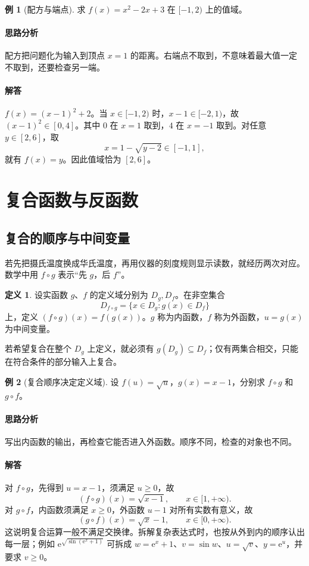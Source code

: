 \documentclass[UTF8,fontset=fandol,12pt,oneside,openany]{ctexrep}
\newcommand{\ee}{\mathrm e}
\theoremstyle{definition}
\newtheorem{definition}[theorem]{定义}
\newtheorem{example}{例}[chapter]
\begin{document}
\begin{example}[配方与端点]
求 $f(x)=x^2-2x+3$ 在 $[-1,2)$ 上的值域。
\end{example}
\paragraph{思路分析} 配方把问题化为输入到顶点 $x=1$ 的距离。右端点不取到，不意味着最大值一定不取到，还要检查另一端。
\paragraph{解答} $f(x)=(x-1)^2+2$。当 $x\in[-1,2)$ 时，$x-1\in[-2,1)$，故 $(x-1)^2\in[0,4]$。其中 $0$ 在 $x=1$ 取到，$4$ 在 $x=-1$ 取到。对任意 $y\in[2,6]$，取
\[
 x=1-\sqrt{y-2}\in[-1,1],
\]
就有 $f(x)=y$。因此值域恰为 $[2,6]$。

\section{复合函数与反函数}
\label{lec:01:composition}
\subsection{复合的顺序与中间变量}
若先把摄氏温度换成华氏温度，再用仪器的刻度规则显示读数，就经历两次对应。数学中用 $f\circ g$ 表示“先 $g$，后 $f$”。

\begin{definition}
设实函数 $g$、$f$ 的定义域分别为 $D_g,D_f$。在非空集合
\[
 D_{f\circ g}=\{x\in D_g:g(x)\in D_f\}
\]
上，定义 $(f\circ g)(x)=f(g(x))$。$g$ 称为内函数，$f$ 称为外函数，$u=g(x)$ 为中间变量。
\end{definition}
若希望复合在整个 $D_g$ 上定义，就必须有 $g(D_g)\subseteq D_f$；仅有两集合相交，只能在符合条件的部分输入上复合。

\begin{example}[复合顺序决定定义域]
设 $f(u)=\sqrt{u}$，$g(x)=x-1$，分别求 $f\circ g$ 和 $g\circ f$。
\end{example}
\paragraph{思路分析} 写出内函数的输出，再检查它能否进入外函数。顺序不同，检查的对象也不同。
\paragraph{解答} 对 $f\circ g$，先得到 $u=x-1$，须满足 $u\ge0$，故
\[
 (f\circ g)(x)=\sqrt{x-1},\qquad x\in[1,+\infty).
\]
对 $g\circ f$，内函数须满足 $x\ge0$，外函数 $u-1$ 对所有实数有意义，故
\[
 (g\circ f)(x)=\sqrt{x}-1,\qquad x\in[0,+\infty).
\]
这说明复合运算一般不满足交换律。拆解复杂表达式时，也按从外到内的顺序认出每一层；例如 $\ee^{\sqrt{\sin(\ee^x+1)}}$ 可拆成 $w=\ee^x+1$、$v=\sin w$、$u=\sqrt v$、$y=\ee^u$，并要求 $v\ge0$。
\end{document}
